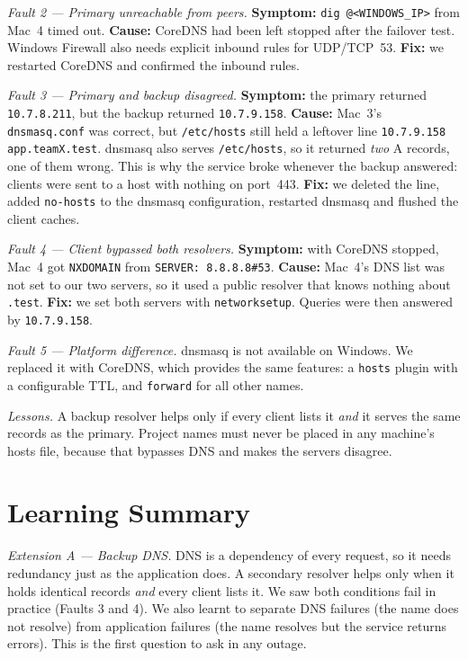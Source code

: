 \documentclass[conference]{IEEEtran}
\newcommand{\ip}[1]{\texttt{#1}}
\begin{document}
\textit{Fault 2 --- Primary unreachable from peers.}
\textbf{Symptom:} \texttt{dig @<WINDOWS\_IP>} from Mac~4 timed out.
\textbf{Cause:} CoreDNS had been left stopped after the failover test. Windows Firewall also needs explicit inbound rules for UDP/TCP~53.
\textbf{Fix:} we restarted CoreDNS and confirmed the inbound rules.

\textit{Fault 3 --- Primary and backup disagreed.}
\textbf{Symptom:} the primary returned \ip{10.7.8.211}, but the backup returned \ip{10.7.9.158}.
\textbf{Cause:} Mac~3's \texttt{dnsmasq.conf} was correct, but \texttt{/etc/hosts} still held a leftover line \texttt{10.7.9.158 app.teamX.test}. dnsmasq also serves \texttt{/etc/hosts}, so it returned \emph{two} A records, one of them wrong. This is why the service broke whenever the backup answered: clients were sent to a host with nothing on port~443.
\textbf{Fix:} we deleted the line, added \texttt{no-hosts} to the dnsmasq configuration, restarted dnsmasq and flushed the client caches.

\textit{Fault 4 --- Client bypassed both resolvers.}
\textbf{Symptom:} with CoreDNS stopped, Mac~4 got \texttt{NXDOMAIN} from \texttt{SERVER: 8.8.8.8\#53}.
\textbf{Cause:} Mac~4's DNS list was not set to our two servers, so it used a public resolver that knows nothing about \texttt{.test}.
\textbf{Fix:} we set both servers with \texttt{networksetup}. Queries were then answered by \ip{10.7.9.158}.

\textit{Fault 5 --- Platform difference.}
dnsmasq is not available on Windows. We replaced it with CoreDNS, which provides the same features: a \texttt{hosts} plugin with a configurable TTL, and \texttt{forward} for all other names.

\textit{Lessons.} A backup resolver helps only if every client lists it \emph{and} it serves the same records as the primary. Project names must never be placed in any machine's hosts file, because that bypasses DNS and makes the servers disagree.

\section{Learning Summary}

\textit{Extension A --- Backup DNS.} DNS is a dependency of every request, so it needs redundancy just as the application does. A secondary resolver helps only when it holds identical records \emph{and} every client lists it. We saw both conditions fail in practice (Faults 3 and 4). We also learnt to separate DNS failures (the name does not resolve) from application failures (the name resolves but the service returns errors). This is the first question to ask in any outage.
\end{document}
